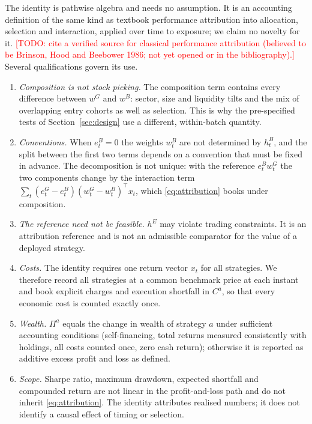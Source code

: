 \documentclass[11pt]{article}
\theoremstyle{remark}
\newcommand{\todo}[1]{\textcolor{red}{[TODO: #1]}}
\begin{document}
The identity is pathwise algebra and needs no assumption. It is an accounting definition of the
same kind as textbook performance attribution into allocation, selection and interaction,
applied over time to exposure; we claim no novelty for it.
\todo{cite a verified source for classical performance attribution (believed to be Brinson, Hood
and Beebower 1986; not yet opened or in the bibliography).}
Several qualifications govern its use.
\begin{enumerate}
\item \emph{Composition is not stock picking.} The composition term contains every difference
between $w^G$ and $w^B$: sector, size and liquidity tilts and the mix of overlapping entry
cohorts as well as selection. This is why the pre-specified tests of Section~\ref{sec:design}
use a different, within-batch quantity.
\item \emph{Conventions.} When $e_t^B=0$ the weights $w_t^B$ are not determined by $h_t^B$, and
the split between the first two terms depends on a convention that must be fixed in advance. The
decomposition is not unique: with the reference $e_t^Bw_t^G$ the two components change by the
interaction term $\sum_t(e_t^G-e_t^B)(w_t^G-w_t^B)^\top x_t$, which \eqref{eq:attribution} books
under composition.
\item \emph{The reference need not be feasible.} $h^E$ may violate trading constraints. It is an
attribution reference and is not an admissible comparator for the value of a deployed strategy.
\item \emph{Costs.} The identity requires one return vector $x_t$ for all strategies. We
therefore record all strategies at a common benchmark price at each instant and book explicit
charges and execution shortfall in $C^a$, so that every economic cost is counted exactly once.
\item \emph{Wealth.} $\Pi^a$ equals the change in wealth of strategy $a$ under sufficient
accounting conditions (self-financing, total returns measured consistently with holdings, all
costs counted once, zero cash return); otherwise it is reported as additive excess profit and
loss as defined.
\item \emph{Scope.} Sharpe ratio, maximum drawdown, expected shortfall and compounded return are
not linear in the profit-and-loss path and do not inherit \eqref{eq:attribution}. The identity
attributes realised numbers; it does not identify a causal effect of timing or selection.
\end{enumerate}
\end{document}
